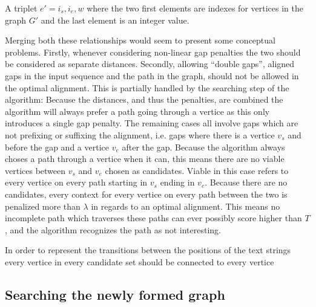 \documentclass[thesis.tex]{subfiles}
\begin{document}
\begin{defn}
	A triplet $e'={i_s, i_e, w}$ where the two first elements are indexes for vertices in the graph $G'$ and the last element is an integer value.
\end{defn}
Merging both these relationships would seem to present some conceptual problems. Firstly, whenever considering non-linear gap penalties the two should be considered as separate distances. Secondly, allowing ``double gaps'', aligned gaps in the input sequence and the path in the graph, should not be allowed in the optimal alignment. This is partially handled by the searching step of the algorithm: Because the distances, and thus the penalties, are combined the algorithm will always prefer a path going through a vertice as this only introduces a single gap penalty. The remaining cases all involve gaps which are not prefixing or suffixing the alignment, i.e. gaps where there is a vertice $v_s$ and before the gap and a vertice $v_e$ after the gap. Because the algorithm always choses a path through a vertice when it can, this means there are no viable vertices between $v_s$ and $v_e$ chosen as candidates. Viable in this case refers to every vertice on every path starting in $v_s$ ending in $v_e$. Because there are no candidates, every context for every vertice on every path between the two is penalized more than $\lambda$ in regards to an optimal alignment. This means no incomplete path which traverses these paths can ever possibly score higher than $T$, and the algorithm recognizes the path as not interesting.\\
\par\noindent
In order to represent the transitions between the positions of the text strings every vertice in every candidate set should be connected to every vertice
\subsection{Searching the newly formed graph}
\end{document}
